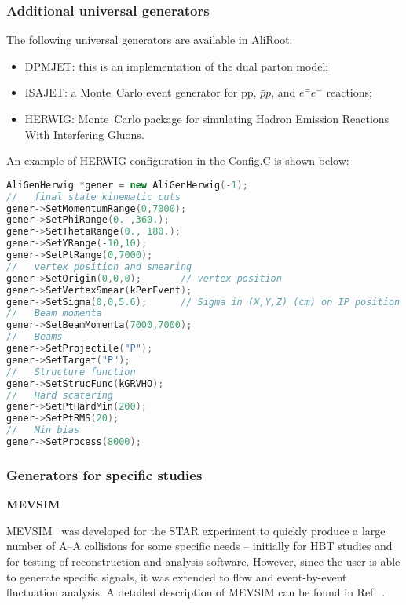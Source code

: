\documentclass[12pt,a4paper,twoside]{article}
\makeatletter
\newcommand {\MC} {Monte~Carlo\@\xspace}
\makeatother
\begin{document}
\subsubsection{Additional universal generators}

The following universal generators are available in AliRoot:

\begin{itemize}
\item DPMJET: this is an implementation of the dual parton
  model\cite{MC:DPMJET};
\item ISAJET: a \MC event generator for pp, $\bar pp$, and $e^=e^-$
  reactions\cite{MC:ISAJET};
\item HERWIG:  \MC package for simulating Hadron Emission
  Reactions With Interfering Gluons\cite{MC:HERWIG}.
\end{itemize}

An example of HERWIG configuration in the Config.C is shown below:
\begin{lstlisting}[language=C++]
AliGenHerwig *gener = new AliGenHerwig(-1);
//   final state kinematic cuts
gener->SetMomentumRange(0,7000);
gener->SetPhiRange(0. ,360.);
gener->SetThetaRange(0., 180.);
gener->SetYRange(-10,10);
gener->SetPtRange(0,7000);
//   vertex position and smearing 
gener->SetOrigin(0,0,0);       // vertex position
gener->SetVertexSmear(kPerEvent);
gener->SetSigma(0,0,5.6);      // Sigma in (X,Y,Z) (cm) on IP position
//   Beam momenta
gener->SetBeamMomenta(7000,7000);
//   Beams
gener->SetProjectile("P");
gener->SetTarget("P");
//   Structure function
gener->SetStrucFunc(kGRVHO);
//   Hard scatering
gener->SetPtHardMin(200);
gener->SetPtRMS(20);
//   Min bias
gener->SetProcess(8000);
\end{lstlisting}

\subsubsection{Generators for specific studies}

\textbf{MEVSIM}

MEVSIM~\cite{MC:MEVSIM} was developed for the STAR experiment to
quickly produce a large number of A--A collisions for some
specific needs -- initially for HBT studies and for testing of
reconstruction and analysis software. However, since the user is
able to generate  specific signals, it was extended to flow and
event-by-event fluctuation analysis.  A detailed description of
MEVSIM can be found in Ref.~\cite{MC:MEVSIM}.
\end{document}
